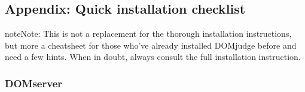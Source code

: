 \documentclass[a4paper,10pt,english,openany]{sphinxmanual}
\begin{document}
\subsection{Appendix: Quick installation checklist}
\label{\detokenize{quick-install:appendix-quick-installation-checklist}}\label{\detokenize{quick-install::doc}}
\begin{sphinxadmonition}{note}{Note:}
\sphinxAtStartPar
This is not a replacement for the thorough installation
instructions, but more a cheat\sphinxhyphen{}sheet for those who’ve already
installed DOMjudge before and need a few hints. When in doubt, always
consult the full installation instruction.
\end{sphinxadmonition}


\subsubsection{DOMserver}
\end{document}
